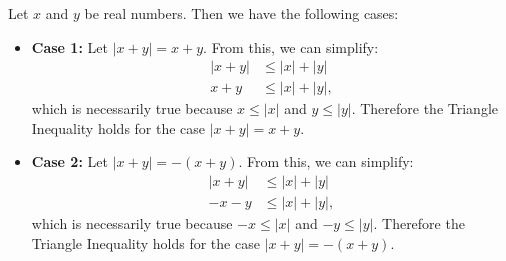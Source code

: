\documentclass{article}
\begin{document}
Let $x$ and $y$ be real numbers. Then we have the following cases:
\begin{itemize}
    \item \textbf{Case 1:} Let $|x+y|=x+y$. From this, we can simplify:
    \begin{align*}
        |x+y| & \leq |x|+|y| \\
        x+y & \leq |x|+|y|,
    \end{align*}
    which is necessarily true because $x\leq |x|$ and $y\leq |y|$. Therefore the Triangle Inequality holds for the case $|x+y|=x+y$.
    
    \item \textbf{Case 2:} Let $|x+y|=-(x+y)$. From this, we can simplify:
    \begin{align*}
        |x+y| & \leq |x|+|y| \\
        -x-y & \leq |x|+|y|,
    \end{align*}
    which is necessarily true because $-x \leq |x|$ and $-y \leq |y|$. Therefore the Triangle Inequality holds for the case $|x+y|=-(x+y)$.
    
    

\end{itemize}
\end{document}
